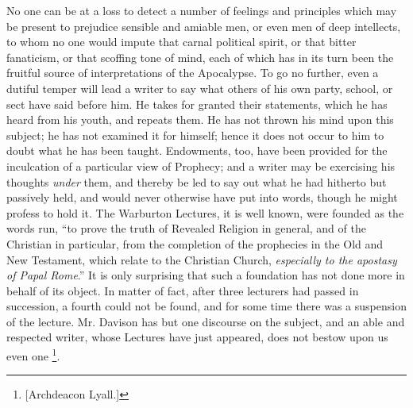 No one can be at a loss to detect a number of feelings and
principles which may be present to prejudice sensible and amiable men,
or even men of deep intellects, to whom no one would impute that
carnal political spirit, or that bitter fanaticism, or that scoffing
tone of mind, each of which has in its turn been the fruitful source
of interpretations of the Apocalypse. To go no further, even a dutiful
temper will lead a writer to say what others of his own party, school,
or sect have said before him. He takes for granted their statements,
which he has heard from his youth, and repeats them. He has not thrown
his mind upon this subject; he has not examined it for himself; hence
it does not occur to him to doubt what he has been taught. Endowments,
too, have been provided for the inculcation of a particular view of
Prophecy; and a writer may be exercising his thoughts \emph{under} them, and
thereby be led to say out what he had hitherto but passively held, and
would never otherwise have put into words, though he might profess to
hold it. The Warburton Lectures, it is well known, were founded as the
words run, ``to prove the truth of Revealed Religion in general,
and of the Christian in particular, from the completion of the
prophecies in the Old and New Testament, which relate to the Christian
Church, \emph{especially to the apostasy of Papal Rome}.'' It is
only surprising that such a foundation has not done more in behalf of
its object. In matter of fact, after three lecturers had passed in
succession, a fourth could not be found, and for some time there was a
suspension of the lecture. Mr. Davison has but one discourse on the
subject, and an able and respected writer, whose Lectures have just
appeared, does not bestow upon us even one \footnote{[Archdeacon
Lyall.]}.

